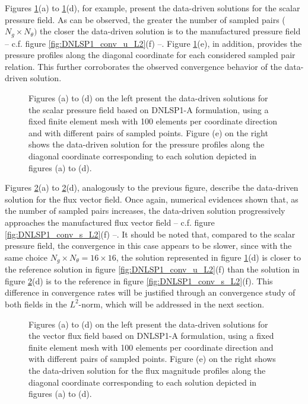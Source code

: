 Figures \ref{fig:DNLSP1_A_plt_over_line_u}(a) to \ref{fig:DNLSP1_A_plt_over_line_u}(d), for example, present the data-driven solutions for the scalar pressure field. As can be observed, the greater the number of sampled pairs  ($N_{g} \times N_{\theta})$ the closer the data-driven solution is to the manufactured pressure field -- c.f. figure \ref{fig:DNLSP1_conv_u_L2}(f) --. Figure \ref{fig:DNLSP1_A_plt_over_line_u}(e), in addition,  provides the pressure profiles along the diagonal coordinate for each considered sampled pair relation. This further corroborates the observed convergence behavior of the data-driven solution. 

\begin{figure}[h!]
	\centering
	\caption{Figures (a) to (d) on the left present the data-driven solutions for the scalar pressure field based on DNLSP1-A formulation, using a fixed finite element mesh with 100 elements per coordinate direction and with different pairs of sampled points. Figure (e) on the right shows the data-driven solution for the pressure profiles along the diagonal coordinate corresponding to each solution depicted in figures (a) to (d).}
	\fontsize{6pt}{10pt}\selectfont 
	\def\svgwidth{\columnwidth}
	
	\label{fig:DNLSP1_A_plt_over_line_u}
\end{figure}

Figures \ref{fig:DNLSP1_A_plt_over_line_s}(a) to \ref{fig:DNLSP1_A_plt_over_line_s}(d), analogously to the previous figure, describe the data-driven solution for the flux vector field. Once again, numerical evidences shown that, as the number of sampled pairs increases, the data-driven solution progressively approaches the manufactured flux vector field -- c.f. figure \ref{fig:DNLSP1_conv_s_L2}(f) --. It should be noted that, compared to the scalar pressure field, the convergence in this case appears to be slower, since with the same choice $ N_{g}\times N_{\theta} = 16 \times 16$, the solution represented in figure \ref{fig:DNLSP1_A_plt_over_line_u}(d) is closer to the reference solution in figure \ref{fig:DNLSP1_conv_u_L2}(f) than the solution in figure \ref{fig:DNLSP1_A_plt_over_line_s}(d) is to the reference in figure \ref{fig:DNLSP1_conv_s_L2}(f). This difference in convergence rates will be justified through an convergence study of both fields in the $ L^{2} $-norm, which will be addressed in the next section.

\begin{figure}[h!]
	\centering
	\caption{Figures (a) to (d) on the left present the data-driven solutions for the vector flux field based on DNLSP1-A formulation, using a fixed finite element mesh with 100 elements per coordinate direction and with different pairs of sampled points. Figure (e) on the right shows the data-driven solution for the flux magnitude profiles along the diagonal coordinate corresponding to each solution depicted in figures (a) to (d).}
	\fontsize{6pt}{10pt}\selectfont 
	\def\svgwidth{\columnwidth}
	
	\label{fig:DNLSP1_A_plt_over_line_s}
\end{figure}

